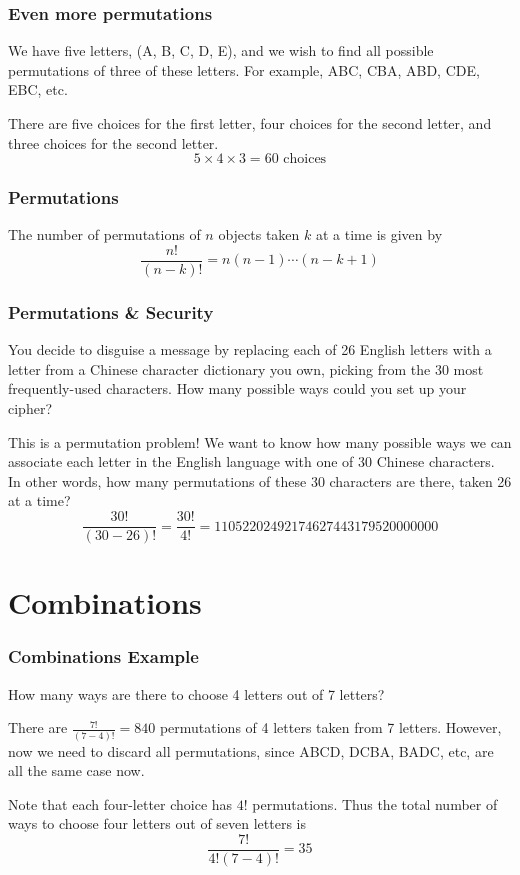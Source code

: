 \documentclass{beamer}
\newcommand{\<}{\langle}
\renewcommand{\>}{\rangle}
\begin{document}
\begin{frame}
\frametitle{Even more permutations}

We have five letters, (A, B, C, D, E), and we wish to find all possible permutations of three of these letters. For example, ABC, CBA, ABD, CDE, EBC, etc. \newline

\pause

There are five choices for the first letter, four choices for the second letter, and three choices for the second letter.
\[
5\times 4 \times 3 = 60 \text{ choices}
\]
\end{frame}


\begin{frame}
\frametitle{Permutations}

The {\color{red}number of permutations of $n$ objects taken $k$ at a time} is given by
\[
\frac{n!}{(n-k)!} = n(n-1)\cdots(n-k+1)
\]
\end{frame}

\begin{frame}
\frametitle{Permutations \& Security}

You decide to disguise a message by replacing each of 26 English letters with a letter from a Chinese character dictionary you own, picking from the 30 most frequently-used characters.  How many possible ways could you set up your cipher?\newline 

\pause

This is a permutation problem! We want to know how many possible ways we can associate each letter in the English language with one of 30 Chinese characters. In other words, how many permutations of these 30 characters are there, taken 26 at a time?
\[
\frac{30!}{(30-26)!} = \frac{30!}{4!} = 11052202492174627443179520000000
\]
\end{frame}

\section{Combinations} 

\begin{frame}
\frametitle{Combinations Example}

How many ways are there to choose 4 letters out of 7 letters? \newline

\pause

There are $\frac{7!}{(7-4)!} = 840$ permutations of 4 letters taken from 7 letters. However, now we need to discard all permutations, since ABCD, DCBA, BADC, etc, are all the same case now. \newline

\pause

Note that each four-letter choice has $4!$ permutations. Thus the total number of ways to choose four letters out of seven letters is 
\[
\frac{7!}{4!(7-4)!} = 35
\]
\end{frame}
\end{document}

